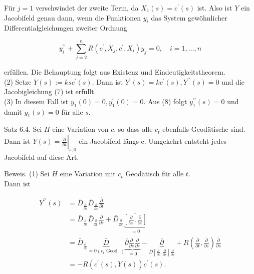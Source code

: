 \documentclass[10pt]{article}
\begin{document}
Für $j=1$ verschwindet der zweite Term, da $X_{1}(s)=c^{\prime}(s)$ ist. Also ist $Y$ ein Jacobifeld genau dann, wenn die Funktionen $y_{i}$ das System gewöhnlicher Differentialgleichungen zweiter Ordnung


\begin{equation*}
y_{i}^{\prime \prime}+\sum_{j=2}^{n} R\left(c^{\prime}, X_{j}, c^{\prime}, X_{i}\right) y_{j}=0, \quad i=1, \ldots, n \tag{8}
\end{equation*}


erfüllen. Die Behauptung folgt aus Existenz und Eindeutigkeitstheorem.\\
(2) Setze $Y(s):=k s c^{\prime}(s)$. Dann ist $Y^{\prime}(s)=k c^{\prime}(s), Y^{\prime \prime}(s)=0$ und die Jacobigleichung (7) ist erfüllt.\\
(3) In diesem Fall ist $y_{1}(0)=0, y_{1}^{\prime}(0)=0$. Aus (8) folgt $y_{1}^{\prime \prime}(s)=0$ und damit $y_{1}(s)=0$ für alle $s$.

Satz 6.4. Sei $H$ eine Variation von $c$, so dass alle $c_{t}$ ebenfalls Geodätische sind. Dann ist $Y(s)=\left.\overline{\frac{\partial}{\partial t}}\right|_{s, 0}$ ein Jacobifeld längs c. Umgekehrt entsteht jedes Jacobifeld auf diese Art.

Beweis. (1) Sei $H$ eine Variation mit $c_{t}$ Geodätisch für alle $t$.\\
Dann ist

$$
\begin{aligned}
Y^{\prime \prime}(s) & =\bar{D}_{\frac{\partial}{\partial s}} \bar{D}_{\frac{\partial}{\partial s}} \frac{\bar{\partial}}{\partial t} \\
& =\bar{D}_{\frac{\partial}{\partial s}} \bar{D}_{\frac{\partial}{\partial t}} \frac{\bar{\partial}}{\partial s}+\bar{D}_{\frac{\partial}{\partial s}} \underbrace{\overline{\left[\frac{\partial}{\partial s}, \frac{\partial}{\partial t}\right]}}_{=0} \\
& =\bar{D}_{\frac{\partial}{\partial t}} \underbrace{\bar{D}}_{=0\left(c_{t} \text { Geod. }\right)} \underbrace{\bar{\partial} \frac{\partial}{\partial s} \frac{\partial}{\partial s}}_{=0}-\underbrace{\bar{\partial}}_{\bar{D}\left[\frac{\partial}{\partial t}, \frac{\partial}{\partial s}\right] \frac{\partial}{\partial s}}+R\left(\frac{\bar{\partial}}{\partial t}, \frac{\bar{\partial}}{\partial s}\right) \frac{\bar{\partial}}{\partial s} \\
& =-R\left(c^{\prime}(s), Y(s)\right) c^{\prime}(s) .
\end{aligned}
$$
\end{document}
